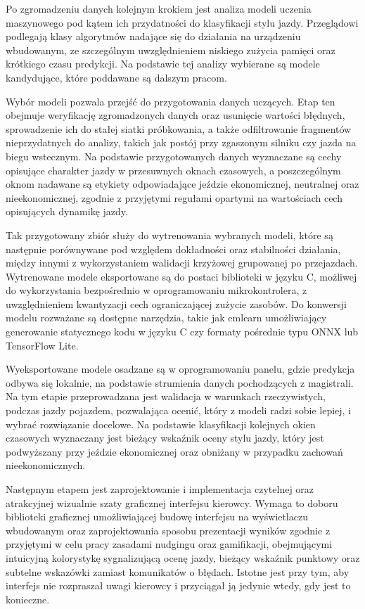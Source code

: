 Po zgromadzeniu danych kolejnym krokiem jest analiza modeli uczenia maszynowego
pod kątem ich przydatności do klasyfikacji stylu jazdy. Przeglądowi podlegają klasy
algorytmów nadające się do działania na urządzeniu wbudowanym, ze szczególnym
uwzględnieniem niskiego zużycia pamięci oraz krótkiego czasu predykcji. Na
podstawie tej analizy wybierane są modele kandydujące, które poddawane są
dalszym pracom.

Wybór modeli pozwala przejść do przygotowania danych uczących. Etap ten obejmuje
weryfikację zgromadzonych danych oraz usunięcie wartości błędnych, sprowadzenie
ich do stałej siatki próbkowania, a także odfiltrowanie fragmentów nieprzydatnych do
analizy, takich jak postój przy zgaszonym silniku czy jazda na biegu wstecznym. Na
podstawie przygotowanych danych wyznaczane są cechy opisujące charakter jazdy
w przesuwnych oknach czasowych, a poszczególnym oknom nadawane są etykiety
odpowiadające jeździe ekonomicznej, neutralnej oraz nieekonomicznej, zgodnie z
przyjętymi regułami opartymi na wartościach cech opisujących dynamikę jazdy.

Tak przygotowany zbiór służy do wytrenowania wybranych modeli, które są następnie
porównywane pod względem dokładności oraz stabilności działania, między innymi z
wykorzystaniem walidacji krzyżowej grupowanej po przejazdach. Wytrenowane
modele eksportowane są do postaci biblioteki w języku C, możliwej do wykorzystania
bezpośrednio w oprogramowaniu mikrokontrolera, z uwzględnieniem kwantyzacji
cech ograniczającej zużycie zasobów. Do konwersji modelu rozważane są dostępne
narzędzia, takie jak emlearn umożliwiający generowanie statycznego kodu w języku
C czy formaty pośrednie typu ONNX lub TensorFlow Lite.

Wyeksportowane modele osadzane są w oprogramowaniu panelu, gdzie predykcja
odbywa się lokalnie, na podstawie strumienia danych pochodzących z magistrali. Na
tym etapie przeprowadzana jest walidacja w warunkach rzeczywistych, podczas jazdy
pojazdem, pozwalająca ocenić, który z modeli radzi sobie lepiej, i wybrać rozwiązanie
docelowe. Na podstawie klasyfikacji kolejnych okien czasowych wyznaczany jest
bieżący wskaźnik oceny stylu jazdy, który jest podwyższany przy jeździe
ekonomicznej oraz obniżany w przypadku zachowań nieekonomicznych.

Następnym etapem jest zaprojektowanie i implementacja czytelnej oraz atrakcyjnej
wizualnie szaty graficznej interfejsu kierowcy. Wymaga to doboru biblioteki graficznej
umożliwiającej budowę interfejsu na wyświetlaczu wbudowanym oraz
zaprojektowania sposobu prezentacji wyników zgodnie z przyjętymi w celu pracy
zasadami nudgingu oraz gamifikacji, obejmującymi intuicyjną kolorystykę
sygnalizującą ocenę jazdy, bieżący wskaźnik punktowy oraz subtelne wskazówki
zamiast komunikatów o błędach. Istotne jest przy tym, aby interfejs nie rozpraszał
uwagi kierowcy i przyciągał ją jedynie wtedy, gdy jest to konieczne.

